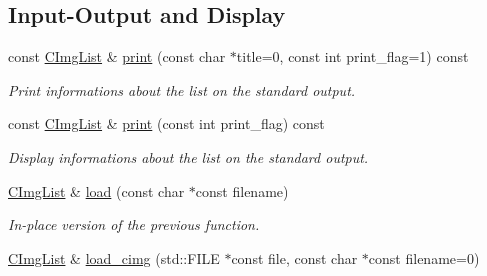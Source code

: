 \subsection*{Input-\/\-Output and Display}
\begin{DoxyCompactItemize}
\item 
\hypertarget{structcimg__library_1_1_c_img_list_a8f8f0a42d746a5cee5f39a53b4a83c40}{const \hyperlink{structcimg__library_1_1_c_img_list}{C\-Img\-List} \& \hyperlink{structcimg__library_1_1_c_img_list_a8f8f0a42d746a5cee5f39a53b4a83c40}{print} (const char $\ast$title=0, const int print\-\_\-flag=1) const }\label{structcimg__library_1_1_c_img_list_a8f8f0a42d746a5cee5f39a53b4a83c40}

\begin{DoxyCompactList}\small\item\em Print informations about the list on the standard output. \end{DoxyCompactList}\item 
\hypertarget{structcimg__library_1_1_c_img_list_a634d0affc59d80ad9ba790d674e73a7e}{const \hyperlink{structcimg__library_1_1_c_img_list}{C\-Img\-List} \& \hyperlink{structcimg__library_1_1_c_img_list_a634d0affc59d80ad9ba790d674e73a7e}{print} (const int print\-\_\-flag) const }\label{structcimg__library_1_1_c_img_list_a634d0affc59d80ad9ba790d674e73a7e}

\begin{DoxyCompactList}\small\item\em Display informations about the list on the standard output. \end{DoxyCompactList}\item 
\hypertarget{structcimg__library_1_1_c_img_list_ae2fce076842991a251d7e7137ee98ea8}{\hyperlink{structcimg__library_1_1_c_img_list}{C\-Img\-List} \& \hyperlink{structcimg__library_1_1_c_img_list_ae2fce076842991a251d7e7137ee98ea8}{load} (const char $\ast$const filename)}\label{structcimg__library_1_1_c_img_list_ae2fce076842991a251d7e7137ee98ea8}

\begin{DoxyCompactList}\small\item\em In-\/place version of the previous function. \end{DoxyCompactList}\item 
\hypertarget{structcimg__library_1_1_c_img_list_a0faab84e39f84291464191aea2e4836f}{\hyperlink{structcimg__library_1_1_c_img_list}{C\-Img\-List} \& \hyperlink{structcimg__library_1_1_c_img_list_a0faab84e39f84291464191aea2e4836f}{load\-\_\-cimg} (std\-::\-F\-I\-L\-E $\ast$const file, const char $\ast$const filename=0)}\label{structcimg__library_1_1_c_img_list_a0faab84e39f84291464191aea2e4836f}


\end{DoxyCompactItemize}
